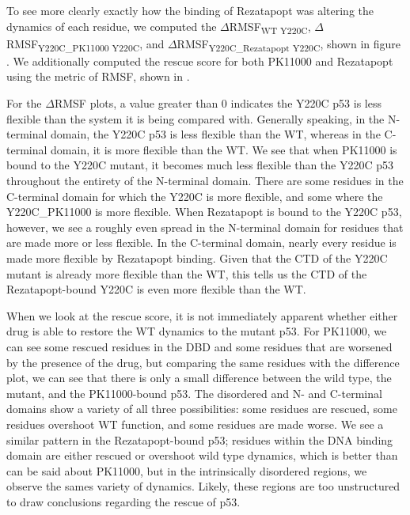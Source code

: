 To see more clearly exactly how the binding of Rezatapopt was altering the dynamics of each residue, we computed the \(\Delta\)RMSF\textsubscript{WT \textminus Y220C}, \(\Delta\)RMSF\textsubscript{Y220C\_PK11000 \textminus Y220C}, and \(\Delta\)RMSF\textsubscript{Y220C\_Rezatapopt \textminus Y220C}, shown in figure . We additionally computed the rescue score for both PK11000 and Rezatapopt using the metric of RMSF, shown in .

For the \(\Delta\)RMSF plots, a value greater than \num{0} indicates the Y220C p53 is less flexible than the system it is being compared with. Generally speaking, in the N-terminal domain, the Y220C p53 is less flexible than the WT, whereas in the C-terminal domain, it is more flexible than the WT. We see that when PK11000 is bound to the Y220C mutant, it becomes much less flexible than the Y220C p53 throughout the entirety of the N-terminal domain. There are some residues in the C-terminal domain for which the Y220C is more flexible, and some where the Y220C\_PK11000 is more flexible. When Rezatapopt is bound to the Y220C p53, however, we see a roughly even spread in the N-terminal domain for residues that are made more or less flexible. In the C-terminal domain, nearly every residue is made more flexible by Rezatapopt binding. Given that the CTD of the Y220C mutant is already more flexible than the WT, this tells us the CTD of the Rezatapopt-bound Y220C is even more flexible than the WT.

When we look at the rescue score, it is not immediately apparent whether either drug is able to restore the WT dynamics to the mutant p53. For PK11000, we can see some rescued residues in the DBD and some residues that are worsened by the presence of the drug, but comparing the same residues with the difference plot, we can see that there is only a small difference between the wild type, the mutant, and the PK11000-bound p53. The disordered and N- and C-terminal domains show a variety of all three possibilities: some residues are rescued, some residues overshoot WT function, and some residues are made worse. We see a similar pattern in the Rezatapopt-bound p53; residues within the DNA binding domain are either rescued or overshoot wild type dynamics, which is better than can be said about PK11000, but in the intrinsically disordered regions, we observe the sames variety of dynamics. Likely, these regions are too unstructured to draw conclusions regarding the rescue of p53.

